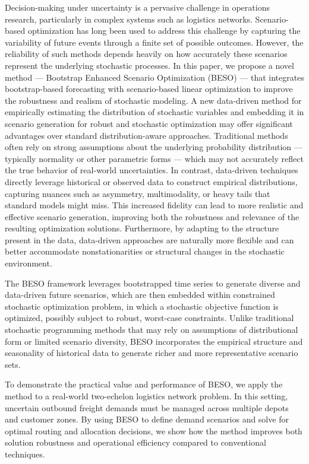 \documentclass[preprint,11pt,authoryear]{elsarticle}
\begin{document}
Decision-making under uncertainty is a pervasive challenge in operations research, particularly in complex systems such as logistics networks. Scenario-based optimization has long been used to address this challenge by capturing the variability of future events through a finite set of possible outcomes. However, the reliability of such methods depends heavily on how accurately these scenarios represent the underlying stochastic processes. In this paper, we propose a novel method — Bootstrap Enhanced Scenario Optimization (BESO) — that integrates bootstrap-based forecasting with scenario-based linear optimization to improve the robustness and realism of stochastic modeling. A new data-driven method for empirically estimating the distribution of stochastic variables and embedding it in scenario generation for robust and stochastic optimization may offer significant advantages over standard distribution-aware approaches. Traditional methods often rely on strong assumptions about the underlying probability distribution — typically normality or other parametric forms — which may not accurately reflect the true behavior of real-world uncertainties. In contrast, data-driven techniques directly leverage historical or observed data to construct empirical distributions, capturing nuances such as asymmetry, multimodality, or heavy tails that standard models might miss. This increased fidelity can lead to more realistic and effective scenario generation, improving both the robustness and relevance of the resulting optimization solutions. Furthermore, by adapting to the structure present in the data, data-driven approaches are naturally more flexible and can better accommodate nonstationarities or structural changes in the stochastic environment.

The BESO framework leverages bootstrapped time series to generate diverse and data-driven future scenarios, which are then embedded within constrained stochastic optimization problem, in which a stochastic objective function is optimized, possibly subject to robust, worst-case constraints. Unlike traditional stochastic programming methods that may rely on assumptions of distributional form or limited scenario diversity, BESO incorporates the empirical structure and seasonality of historical data to generate richer and more representative scenario sets.

To demonstrate the practical value and performance of BESO, we apply the method to a real-world two-echelon logistics network problem. In this setting, uncertain outbound freight demands must be managed across multiple depots and customer zones. By using BESO to define demand scenarios and solve for optimal routing and allocation decisions, we show how the method improves both solution robustness and operational efficiency compared to conventional techniques.
\end{document}
